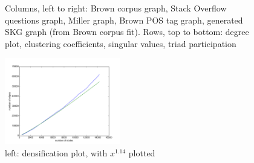 \documentclass[12pt]{article}
\begin{document}
\begin{figure}
  \caption{Columns, left to right: Brown corpus graph, Stack Overflow questions graph, Miller graph, Brown POS tag graph, generated SKG graph (from Brown corpus fit). Rows, top to bottom: degree plot, clustering coefficients, singular values, triad participation}
\end{figure}




\begin{figure}
  \includegraphics[width=0.45\textwidth]{densification_plot.png}
  \caption{left: densification plot, with $x^{1.14}$ plotted}
\end{figure}

\end{document}
